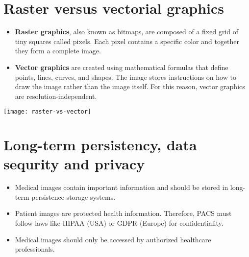 \section{Raster versus vectorial graphics}
\begin{itemize}
\item \textbf{Raster graphics}, also known as bitmaps, are composed of
  a fixed grid of tiny squares called pixels. Each pixel contains a
  specific color and together they form a complete image.
\item \textbf{Vector graphics} are created using mathematical formulas
  that define points, lines, curves, and shapes. The image stores
  instructions on how to draw the image rather than the image itself.
  For this reason, vector graphics are resolution-independent.
\end{itemize}
\begin{center}
  \texttt{[image: raster-vs-vector]}
\end{center}

\section{Long-term persistency, data sequrity and privacy}
\begin{itemize}
\item Medical images contain important information and should be
  stored in long-term persistence storage systems.
\item Patient images are protected health information. Therefore,
  \gls{PACS} must follow laws like HIPAA (USA) or GDPR (Europe) for
  confidentiality.
\item Medical images should only be accessed by authorized healthcare
  professionals.
\end{itemize}